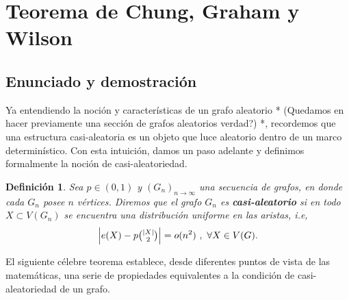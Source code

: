 \documentclass{article}[14pts]
\newcommand{\hh}[1]{{\color{red} * #1 *}}
\newtheorem{definicion}{Definición}
\begin{document}
\section{Teorema de Chung, Graham y Wilson} \label{CGW}

\subsection{Enunciado y demostración}

Ya entendiendo la noción y características de un grafo aleatorio \hh{(Quedamos en hacer previamente una sección de grafos aleatorios verdad?)}, recordemos que una estructura casi-aleatoria es un objeto que luce aleatorio dentro de un marco determinístico. Con esta intuición, damos un paso adelante y definimos formalmente la noción de casi-aleatoriedad.\medskip

\begin{definicion} \label{casi-aleatoriedad}
    Sea $p\in(0,1)$ y $(G_n)_{n\to\infty}$ una secuencia de grafos, en donde cada $G_n$ posee $n$ vértices. Diremos que el grafo $G_n$ es \textbf{casi-aleatorio} si en todo $X\subset V(G_n)$ se encuentra una distribución uniforme en las aristas, i.e,
    \begin{equation*}
        \Big| e(X) - p\tbinom{|X|}{2} \Big| = o(n^{2})\ ,\ \forall X\in V(G).
    \end{equation*}
\end{definicion}\medskip


El siguiente célebre teorema establece, desde diferentes puntos de vista de las matemáticas, una serie de propiedades equivalentes a la condición de casi-aleatoriedad de un grafo.\medskip
\end{document}
